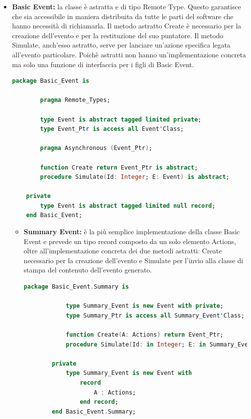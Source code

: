 \documentclass[aps,letterpaper,10pt]{article}
\begin{document}
\begin{itemize}
	\item \textbf{Basic Event:} la classe \`e astratta e di tipo Remote Type. Questo garantisce che sia accessibile in maniera distribuita da tutte le parti del software che hanno necessit\`a di richiamarla. Il metodo astratto Create \`e necessario per la creazione dell'evento e per la restituzione del suo puntatore. Il metodo Simulate, anch'esso astratto, serve per lanciare un'azione specifica legata all'evento particolare. Poich\`e astratti non hanno un'implementazione concreta ma solo una funzione di interfaccia per i figli di Basic Event.
	
	\begin{lstlisting}[language=Ada]
	package Basic_Event is
    
		pragma Remote_Types;
		
		type Event is abstract tagged limited private;
		type Event_Ptr is access all Event'Class;

		pragma Asynchronous (Event_Ptr);

		function Create return Event_Ptr is abstract;
	    procedure Simulate(Id: Integer; E: Event) is abstract;
	
	private
	    type Event is abstract tagged limited null record;
	end Basic_Event;
	\end{lstlisting}
	
	\begin{itemize}
		\item \textbf{Summary Event:} \`e la pi\`u semplice implementazione della classe Basic Event e prevede un tipo record composto da un solo elemento Actions, oltre all'implementazione concreta dei due metodi astratti: Create necessario per la creazione dell'evento e Simulate per l'invio alla classe di stampa del contenuto dell'evento generato.
		
		\begin{lstlisting}[language=Ada]
		package Basic_Event.Summary is
    
			type Summary_Event is new Event with private; 
		    type Summary_Ptr is access all Summary_Event'Class;
	
		    function Create(A: Actions) return Event_Ptr; 
		    procedure Simulate(Id: in Integer; E: in Summary_Event);
		
		private
		    type Summary_Event is new Event with
		        record 
			        A : Actions;
		        end record;
		end Basic_Event.Summary;
		\end{lstlisting}
		

\end{itemize}
\end{itemize}
\end{document}
